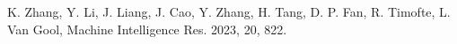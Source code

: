 K. Zhang, Y. Li, J. Liang, J. Cao, Y. Zhang, H. Tang, D. P. Fan, R.
Timofte, L. Van Gool, Machine Intelligence Res. 2023, 20, 822.

